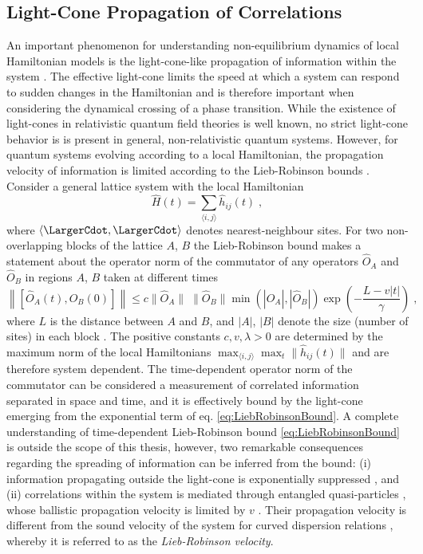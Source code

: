 \subsection{Light-Cone Propagation of Correlations}
An important phenomenon for understanding non-equilibrium dynamics of local Hamiltonian models is the light-cone-like propagation of information within the system \cite{Eisert2015}. The effective light-cone limits the speed at which a system can respond to sudden changes in the Hamiltonian and is therefore important when considering the dynamical crossing of a phase transition.
While the existence of light-cones in relativistic quantum field theories is well known, no strict light-cone behavior is is present in general, non-relativistic quantum systems. However, for quantum systems evolving according to a local Hamiltonian, the propagation velocity of information is limited according to the Lieb-Robinson bounds \cite{Lieb1972}.\\ 
Consider a general lattice system with the local Hamiltonian
\begin{equation}
	\hat{H} (t) = \sum_{\langle i,j \rangle} \hat{h}_{ij}(t) \; ,
\end{equation}
where $\langle \LargerCdot , \LargerCdot \rangle$ denotes nearest-neighbour sites. For two non-overlapping blocks of the lattice $A$, $B$ the Lieb-Robinson bound makes a statement about the operator norm of the commutator
of any operators $\hat{O}_A$ and $\hat{O}_B$ in regions $A$, $B$ taken at
different times
\begin{equation}
	\left\lVert \left[ \hat{O}_A (t) , \hat{O}_B (0) \right] \right\rVert \leq c \lVert \hat{O}_A \rVert \; \lVert \hat{O}_B \rVert
	\min \left( | \hat{O}_A | , | \hat{O}_B | \right) \exp \left(-  \frac{L - v |t|}{\gamma} \right) \; ,
	\label{eq:LiebRobinsonBound}
\end{equation}
where $L$ is the distance between $A$ and $B$, and $| A |$, $| B |$ denote the size (number of sites) in each block \cite{Bravyi2006}. The positive constants $c,v,\lambda > 0$ are determined by the maximum norm of the local Hamiltonians $\max_{\langle i,j \rangle} \max_{t}  \lVert \hat{h}_{ij} (t) \rVert $ and are therefore system dependent. The time-dependent operator norm of the commutator can be considered a measurement of correlated information separated in space and time, and it is effectively bound by the light-cone emerging from the exponential term of eq. \eqref{eq:LiebRobinsonBound}.
A complete understanding of time-dependent Lieb-Robinson bound \eqref{eq:LiebRobinsonBound} is outside the scope of this thesis, however, two remarkable consequences regarding the spreading of information can be inferred from the bound: (i) information propagating outside the light-cone is exponentially suppressed \cite{Bravyi2006}, and (ii) correlations within the system is mediated through entangled quasi-particles \cite{Cheneau2012}, whose ballistic propagation velocity is limited by $v$ \cite{Calabrese2006}. Their propagation velocity is different from the sound velocity of the system for curved dispersion relations \cite{Lauchli2008}, whereby it is referred to as the \textit{Lieb-Robinson velocity}.

